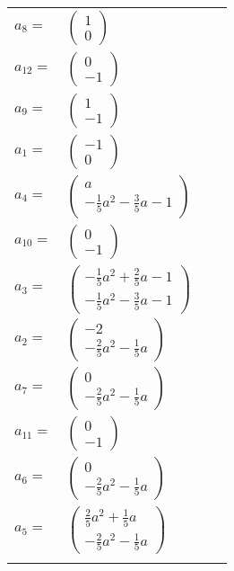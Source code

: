 \documentclass[1p]{elsarticle_modified}
\theoremstyle{definition}
\begin{document}
\begin{tabular}{m{7pt} m{180pt} m{7pt} m{180pt} }
\flushright $a_{8}=$&$\begin{pmatrix}1\\0\end{pmatrix}$ \\
\flushright $a_{12}=$&$\begin{pmatrix}0\\-1\end{pmatrix}$ \\
\flushright $a_{9}=$&$\begin{pmatrix}1\\-1\end{pmatrix}$ \\
\flushright $a_{1}=$&$\begin{pmatrix}-1\\0\end{pmatrix}$ \\
\flushright $a_{4}=$&$\begin{pmatrix}a\\-\frac{1}{5} a^2-\frac{3}{5} a-1\end{pmatrix}$ \\
\flushright $a_{10}=$&$\begin{pmatrix}0\\-1\end{pmatrix}$ \\
\flushright $a_{3}=$&$\begin{pmatrix}-\frac{1}{5} a^2+\frac{2}{5} a-1\\-\frac{1}{5} a^2-\frac{3}{5} a-1\end{pmatrix}$ \\
\flushright $a_{2}=$&$\begin{pmatrix}-2\\-\frac{2}{5} a^2-\frac{1}{5} a\end{pmatrix}$ \\
\flushright $a_{7}=$&$\begin{pmatrix}0\\-\frac{2}{5} a^2-\frac{1}{5} a\end{pmatrix}$ \\
\flushright $a_{11}=$&$\begin{pmatrix}0\\-1\end{pmatrix}$ \\
\flushright $a_{6}=$&$\begin{pmatrix}0\\-\frac{2}{5} a^2-\frac{1}{5} a\end{pmatrix}$ \\
\flushright $a_{5}=$&$\begin{pmatrix}\frac{2}{5} a^2+\frac{1}{5} a\\-\frac{2}{5} a^2-\frac{1}{5} a\end{pmatrix}$\\&\end{tabular}
\end{document}
